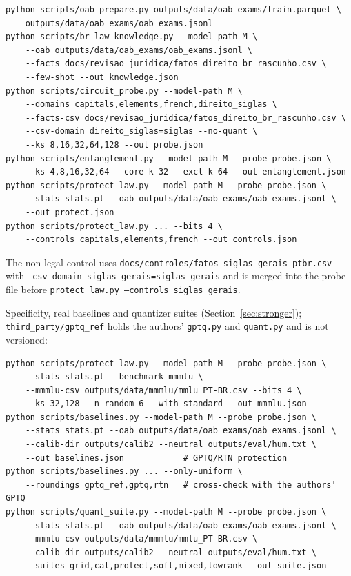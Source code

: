 \documentclass[11pt]{article}
\newcommand{\code}[1]{\texttt{#1}}
\begin{document}
\begin{small}\begin{verbatim}
python scripts/oab_prepare.py outputs/data/oab_exams/train.parquet \
    outputs/data/oab_exams/oab_exams.jsonl
python scripts/br_law_knowledge.py --model-path M \
    --oab outputs/data/oab_exams/oab_exams.jsonl \
    --facts docs/revisao_juridica/fatos_direito_br_rascunho.csv \
    --few-shot --out knowledge.json
python scripts/circuit_probe.py --model-path M \
    --domains capitals,elements,french,direito_siglas \
    --facts-csv docs/revisao_juridica/fatos_direito_br_rascunho.csv \
    --csv-domain direito_siglas=siglas --no-quant \
    --ks 8,16,32,64,128 --out probe.json
python scripts/entanglement.py --model-path M --probe probe.json \
    --ks 4,8,16,32,64 --core-k 32 --excl-k 64 --out entanglement.json
python scripts/protect_law.py --model-path M --probe probe.json \
    --stats stats.pt --oab outputs/data/oab_exams/oab_exams.jsonl \
    --out protect.json
python scripts/protect_law.py ... --bits 4 \
    --controls capitals,elements,french --out controls.json
\end{verbatim}\end{small}
The non-legal control uses \code{docs/controles/fatos\_siglas\_gerais\_ptbr.csv} with \code{--csv-domain siglas\_gerais=siglas\_gerais} and is merged into the probe file before \code{protect\_law.py --controls siglas\_gerais}.

Specificity, real baselines and quantizer suites (Section~\ref{sec:stronger}); \code{third\_party/gptq\_ref} holds the authors' \code{gptq.py} and \code{quant.py} and is not versioned:
\begin{small}\begin{verbatim}
python scripts/protect_law.py --model-path M --probe probe.json \
    --stats stats.pt --benchmark mmmlu \
    --mmmlu-csv outputs/data/mmmlu/mmlu_PT-BR.csv --bits 4 \
    --ks 32,128 --n-random 6 --with-standard --out mmmlu.json
python scripts/baselines.py --model-path M --probe probe.json \
    --stats stats.pt --oab outputs/data/oab_exams/oab_exams.jsonl \
    --calib-dir outputs/calib2 --neutral outputs/eval/hum.txt \
    --out baselines.json            # GPTQ/RTN protection
python scripts/baselines.py ... --only-uniform \
    --roundings gptq_ref,gptq,rtn   # cross-check with the authors' GPTQ
python scripts/quant_suite.py --model-path M --probe probe.json \
    --stats stats.pt --oab outputs/data/oab_exams/oab_exams.jsonl \
    --mmmlu-csv outputs/data/mmmlu/mmlu_PT-BR.csv \
    --calib-dir outputs/calib2 --neutral outputs/eval/hum.txt \
    --suites grid,cal,protect,soft,mixed,lowrank --out suite.json
\end{verbatim}\end{small}
\end{document}
